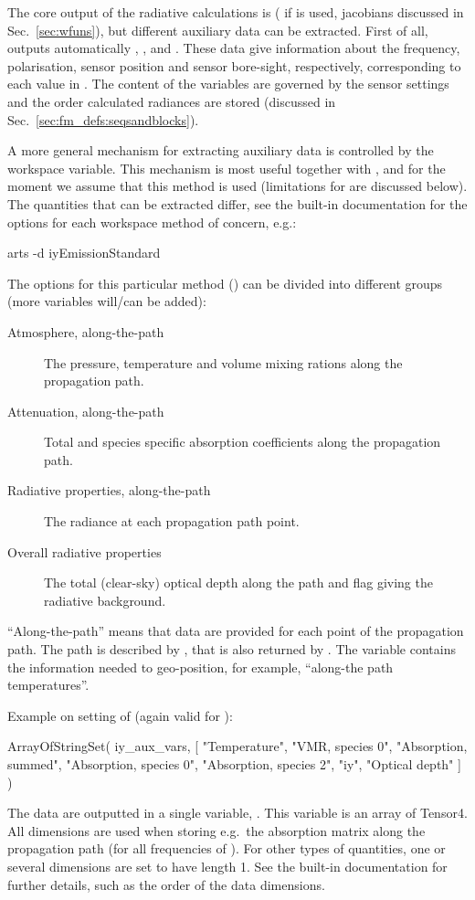 The core output of the radiative calculations is 
( if  is used, jacobians discussed in
Sec.~\ref{sec:wfuns}), but different auxiliary data can be extracted. First of
all,  outputs automatically , ,
 and . These data give information about the
frequency, polarisation, sensor position and sensor bore-sight, respectively,
corresponding to each value in . The content of the variables are
governed by the sensor settings and the order calculated radiances are stored
(discussed in Sec.~\ref{sec:fm_defs:seqsandblocks}).

A more general mechanism for extracting auxiliary data is controlled by the
 workspace variable. This mechanism is most useful
together with , and for the moment we assume that this
method is used (limitations for  are discussed below). The
quantities that can be extracted differ, see the built-in documentation for
the options for each workspace method of concern, e.g.:
\begin{code}
arts -d iyEmissionStandard
\end{code}
The options for this particular method  () can be
divided into different groups (more variables will/can be added):
\begin{description}
\item[Atmosphere, along-the-path] The pressure, temperature and volume mixing
  rations along the propagation path.
\item[Attenuation, along-the-path] Total and species specific absorption
  coefficients along the propagation path.
\item[Radiative properties, along-the-path] The radiance at each propagation
  path point.
\item[Overall radiative properties] The total (clear-sky) optical depth along
  the path and flag giving the radiative background.
\end{description}
``Along-the-path'' means that data are provided for each point of the
propagation path. The path is described by , that is also
returned by . The  variable
contains the information needed to geo-position, for example, ``along-the path
temperatures''. 

Example on setting of  (again valid for
):
\begin{code}
ArrayOfStringSet( iy_aux_vars,  
    [ "Temperature", 
      "VMR, species 0",
      "Absorption, summed", 
      "Absorption, species 0",
      "Absorption, species 2",
      "iy", 
      "Optical depth" ] )
\end{code}
The data are outputted in a single variable, . This variable
is an array of Tensor4. All dimensions are used when storing e.g.\ the
absorption matrix along the propagation path (for all frequencies of
). For other types of quantities, one or several dimensions
are set to have length 1. See the built-in documentation for further details,
such as the order of the data dimensions.

